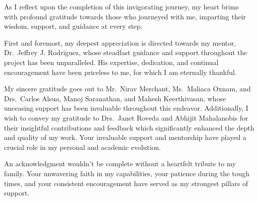 As I reflect upon the completion of this invigorating journey, my heart brims with profound gratitude towards those who journeyed with me, imparting their wisdom, support, and guidance at every step.

First and foremost, my deepest appreciation is directed towards my mentor, Dr.\ Jeffrey J. Rodriguez, whose steadfast guidance and support throughout the project has been unparalleled. His expertise, dedication, and continual encouragement have been priceless to me, for which I am eternally thankful.

My sincere gratitude goes out to Mr.\ Nirav Merchant, Ms.\ Maliaca Oxnam, and Drs.\ Carlos Alsua, Manoj Saranathan, and Mahesh Keerthivasan, whose unceasing support has been invaluable throughout this endeavor. Additionally, I wish to convey my gratitude to Drs.\ Janet Roveda and Abhijit Mahalanobis for their insightful contributions and feedback which significantly enhanced the depth and quality of my work. Your invaluable support and mentorship have played a crucial role in my personal and academic evolution.

An acknowledgment wouldn't be complete without a heartfelt tribute to my family. Your unwavering faith in my capabilities, your patience during the tough times, and your consistent encouragement have served as my strongest pillars of support.

